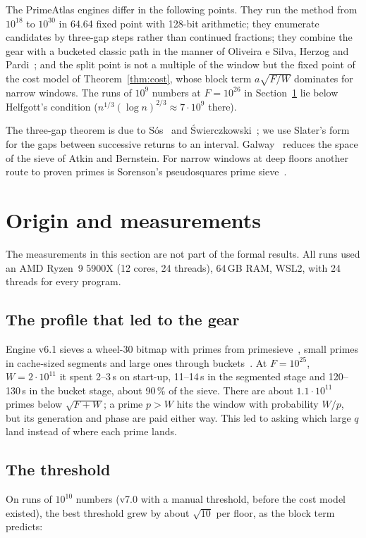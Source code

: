 \documentclass[11pt]{amsart}
\theoremstyle{definition}
\begin{document}
The PrimeAtlas engines differ in the following points. They run the method from $10^{18}$ to
$10^{30}$ in 64.64 fixed point with 128-bit arithmetic; they enumerate candidates by
three-gap steps rather than continued fractions; they combine the gear with a bucketed
classic path in the manner of Oliveira e Silva, Herzog and Pardi~\cite{oes}; and the split
point is not a multiple of the window but the fixed point of the cost model of
Theorem~\ref{thm:cost}, whose block term $a\sqrt{F/W}$ dominates for narrow windows. The runs
of $10^9$ numbers at $F = 10^{26}$ in Section~\ref{sec:bench} lie below Helfgott's condition
($n^{1/3}(\log n)^{2/3} \approx 7\cdot 10^9$ there).

The three-gap theorem is due to S\'os~\cite{sos} and \'Swierczkowski~\cite{swierczkowski}; we
use Slater's form~\cite{slater} for the gaps between successive returns to an interval.
Galway~\cite{galway} reduces the space of the sieve of Atkin and Bernstein. For narrow
windows at deep floors another route to proven primes is Sorenson's pseudosquares prime
sieve~\cite{sorenson2006}.

\section{Origin and measurements}\label{sec:bench}

The measurements in this section are not part of the formal results. All runs used an AMD
Ryzen~9 5900X (12 cores, 24 threads), 64\,GB RAM, WSL2, with 24 threads for every program.

\subsection*{The profile that led to the gear}
Engine v6.1 sieves a wheel-30 bitmap with primes from primesieve~\cite{primesieve}, small
primes in cache-sized segments and large ones through buckets~\cite{oes}. At
$F = 10^{25}$, $W = 2\cdot 10^{11}$ it spent 2--3\,s on start-up, 11--14\,s in the segmented
stage and 120--130\,s in the bucket stage, about 90\,\% of the sieve. There are about
$1.1\cdot 10^{11}$ primes below $\sqrt{F+W}$; a prime $p > W$ hits the window with
probability $W/p$, but its generation and phase are paid either way. This led to asking
which large $q$ land instead of where each prime lands.

\subsection*{The threshold}
On runs of $10^{10}$ numbers (v7.0 with a manual threshold, before the cost model existed),
the best threshold grew by about $\sqrt{10}$ per floor, as the block term predicts:
\end{document}
